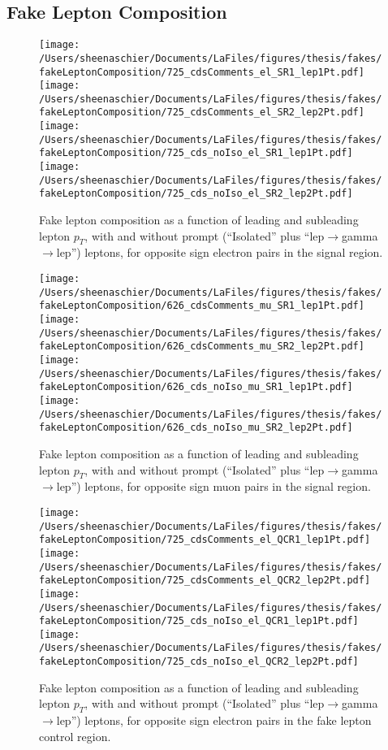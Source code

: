   \FloatBarrier
  \subsection{Fake Lepton Composition}

\begin{figure}[htb]
        \centering
        \texttt{[image: /Users/sheenaschier/Documents/LaFiles/figures/thesis/fakes/fakeLeptonComposition/725\_cdsComments\_el\_SR1\_lep1Pt.pdf]}
        \texttt{[image: /Users/sheenaschier/Documents/LaFiles/figures/thesis/fakes/fakeLeptonComposition/725\_cdsComments\_el\_SR2\_lep2Pt.pdf]}
        \texttt{[image: /Users/sheenaschier/Documents/LaFiles/figures/thesis/fakes/fakeLeptonComposition/725\_cds\_noIso\_el\_SR1\_lep1Pt.pdf]}
        \texttt{[image: /Users/sheenaschier/Documents/LaFiles/figures/thesis/fakes/fakeLeptonComposition/725\_cds\_noIso\_el\_SR2\_lep2Pt.pdf]}
        \caption{Fake lepton composition as a function of leading and subleading lepton $p_{T}$, with and without prompt (``Isolated'' plus ``lep$\to$gamma$\to$lep'') leptons, for opposite sign electron pairs in the signal region.}
        \label{fig:elSR}
\end{figure}
\begin{figure}[htb]
        \centering
        \texttt{[image: /Users/sheenaschier/Documents/LaFiles/figures/thesis/fakes/fakeLeptonComposition/626\_cdsComments\_mu\_SR1\_lep1Pt.pdf]}
        \texttt{[image: /Users/sheenaschier/Documents/LaFiles/figures/thesis/fakes/fakeLeptonComposition/626\_cdsComments\_mu\_SR2\_lep2Pt.pdf]}
        \texttt{[image: /Users/sheenaschier/Documents/LaFiles/figures/thesis/fakes/fakeLeptonComposition/626\_cds\_noIso\_mu\_SR1\_lep1Pt.pdf]}
        \texttt{[image: /Users/sheenaschier/Documents/LaFiles/figures/thesis/fakes/fakeLeptonComposition/626\_cds\_noIso\_mu\_SR2\_lep2Pt.pdf]}
        \caption{Fake lepton composition as a function of leading and subleading lepton $p_{T}$, with and without prompt (``Isolated'' plus ``lep$\to$gamma$\to$lep'') leptons, for opposite sign muon pairs in the signal region.}
        \label{fig:muSR}
\end{figure}
\begin{figure}[htb]
        \centering
        \texttt{[image: /Users/sheenaschier/Documents/LaFiles/figures/thesis/fakes/fakeLeptonComposition/725\_cdsComments\_el\_QCR1\_lep1Pt.pdf]}
        \texttt{[image: /Users/sheenaschier/Documents/LaFiles/figures/thesis/fakes/fakeLeptonComposition/725\_cdsComments\_el\_QCR2\_lep2Pt.pdf]}
        \texttt{[image: /Users/sheenaschier/Documents/LaFiles/figures/thesis/fakes/fakeLeptonComposition/725\_cds\_noIso\_el\_QCR1\_lep1Pt.pdf]}
        \texttt{[image: /Users/sheenaschier/Documents/LaFiles/figures/thesis/fakes/fakeLeptonComposition/725\_cds\_noIso\_el\_QCR2\_lep2Pt.pdf]}
        \caption{Fake lepton composition as a function of leading and subleading lepton $p_{T}$, with and without prompt (``Isolated'' plus ``lep$\to$gamma$\to$lep'') leptons, for opposite sign electron pairs in the fake lepton control region.}
        \label{fig:elCR}
\end{figure}
